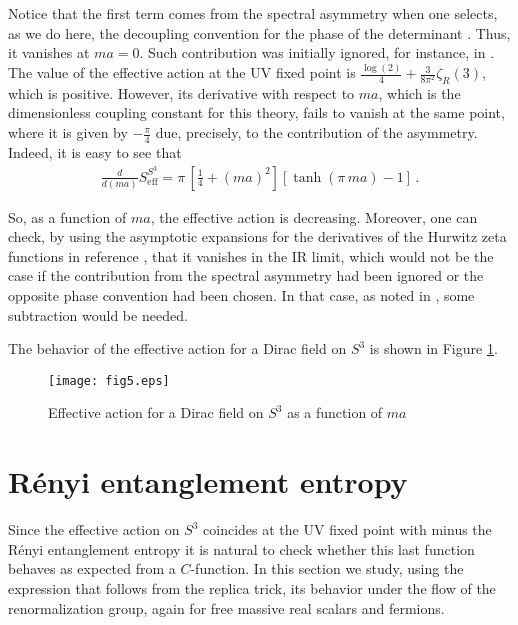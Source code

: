 \documentclass[12pt,a4paper]{article}
\newcommand{\beq}{\begin{eqnarray}}
\newcommand{\eeq}{\end{eqnarray}}
\numberwithin{equation}{section}
\begin{document}
Notice that the first term comes from the spectral asymmetry when one selects, as we do here, the decoupling convention for the phase of the determinant \cite{jackiw}. Thus, it vanishes at $ma=0$. Such contribution was initially ignored, for instance, in \cite{kleF}. The value of the effective action at the UV fixed point is $ \frac{\log(2)}{4}+\frac{3}{8 \pi^2} \zeta_R(3)$, which is positive. However, its derivative with respect to $ma$, which is the dimensionless coupling constant for this theory, fails to vanish at the same point, where it is given by $-\frac{\pi}{4}$ due, precisely, to the contribution of the asymmetry. Indeed, it is easy to see that
\beq
\frac{d}{d(ma)}S_{\mathrm{eff}}^{S^3}=\pi\,\left[\frac14+(ma)^2\right]\left[\tanh(\pi\,ma)-1\right]\,.\label{derdirac}
\eeq

So, as a function of $ma$, the effective action is decreasing. Moreover, one can check, by using the asymptotic expansions for the derivatives of the Hurwitz zeta functions in reference \cite{elizalde}, that it vanishes in the IR limit, which would not be the case if the contribution from the spectral asymmetry had been ignored or the opposite phase convention had been chosen. In that case, as noted in \cite{kleF}, some subtraction would be needed.

The behavior of the effective action for a Dirac field on $S^3$ is shown in Figure \ref{figure1}.


\begin{figure}[h]
	\centering
\texttt{[image: fig5.eps]}
\caption{\small Effective action for a Dirac field on $S^3$ as a function of $ma$}
\label{figure1}
\end{figure}

\section{R\'enyi entanglement entropy}\label{sect3}

Since the effective action on $S^3$ coincides at the UV fixed point with minus the R\'enyi entanglement entropy it is natural to check whether this last function behaves as expected from a $\textit{C}$-function. In this section we study, using the expression that follows from the replica trick, its behavior under the flow of the renormalization group, again for free massive real scalars and fermions.
\end{document}
